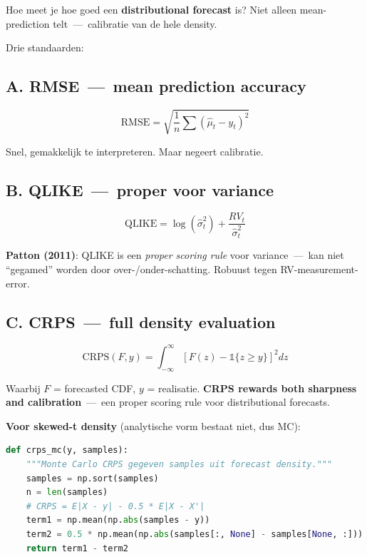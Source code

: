 Hoe meet je hoe goed een \textbf{distributional forecast} is? Niet alleen mean-prediction telt \,---\, calibratie van de hele density.

Drie standaarden:

\hypertarget{a.-rmse-mean-prediction-accuracy}{%
\subsection{A. RMSE \,---\, mean prediction accuracy}\label{a.-rmse-mean-prediction-accuracy}}

\[\text{RMSE} = \sqrt{\frac{1}{n}\sum (\hat\mu_t - y_t)^2}\]

Snel, gemakkelijk te interpreteren. Maar negeert calibratie.

\hypertarget{b.-qlike-proper-voor-variance}{%
\subsection{B. QLIKE \,---\, proper voor variance}\label{b.-qlike-proper-voor-variance}}

\[\text{QLIKE} = \log(\hat\sigma_t^2) + \frac{RV_t}{\hat\sigma_t^2}\]

\textbf{Patton (2011)}: QLIKE is een \emph{proper scoring rule} voor variance \,---\, kan niet ``gegamed'' worden door over-/onder-schatting. Robuust tegen RV-measurement-error.

\hypertarget{c.-crps-full-density-evaluation}{%
\subsection{C. CRPS \,---\, full density evaluation}\label{c.-crps-full-density-evaluation}}

\[\text{CRPS}(F, y) = \int_{-\infty}^{\infty} \left[F(z) - \mathbb{1}\{z \geq y\}\right]^2 dz\]

Waarbij \(F\) = forecasted CDF, \(y\) = realisatie. \textbf{CRPS rewards both sharpness and calibration} \,---\, een proper scoring rule voor distributional forecasts.

\textbf{Voor skewed-t density} (analytische vorm bestaat niet, dus MC):

\begin{lstlisting}[language=Python]
def crps_mc(y, samples):
    """Monte Carlo CRPS gegeven samples uit forecast density."""
    samples = np.sort(samples)
    n = len(samples)
    # CRPS = E|X - y| - 0.5 * E|X - X'|
    term1 = np.mean(np.abs(samples - y))
    term2 = 0.5 * np.mean(np.abs(samples[:, None] - samples[None, :]))
    return term1 - term2
\end{lstlisting}

